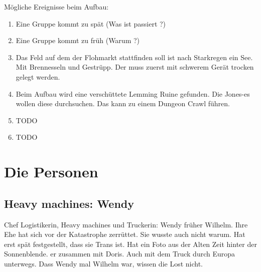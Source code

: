 Mögliche Ereignisse beim Aufbau:

\begin{enumerate}
\item Eine Gruppe kommt zu spät (Was ist passiert ?)
\item Eine Gruppe kommt zu früh (Warum ?)
\item Das Feld auf dem der Flohmarkt stattfinden soll ist nach Starkregen ein See. Mit Brennesseln und Gestrüpp. Der muss zuerst mit schwerem Gerät trocken gelegt werden.
\item Beim Aufbau wird eine verschüttete Lemming Ruine gefunden. Die Jones-es wollen diese durchsuchen. Das kann zu einem Dungeon Crawl führen.
\item TODO
\item TODO
\end{enumerate}

\chapter{Die Personen}

\section{Heavy machines: Wendy}

Chef Logistikerin, Heavy machines und Truckerin: Wendy früher Wilhelm. Ihre Ehe hat sich vor der Katastrophe zerrüttet. Sie wusste auch nicht warum. Hat erst spät festgestellt, dass sie Trans ist. Hat ein Foto aus der Alten Zeit hinter der Sonnenblende. er zusammen mit Doris. Auch mit dem Truck durch Europa unterwegs. Dass Wendy mal Wilhelm war, wissen die Lost nicht.

